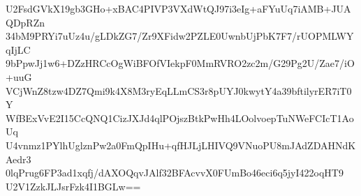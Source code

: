U2FsdGVkX19gb3GHo+xBAC4PIVP3VXdWtQJ97i3eIg+aFYuUq7iAMB+JUAQDpRZn
34bM9PRYi7uUz4u/gLDkZG7/Zr9XFidw2PZLE0UwnbUjPbK7F7/rUOPMLWYqIjLC
9bPpwJj1w6+DZzHRCcOgWiBFOfVIekpF0MmRVRO2zc2m/G29Pg2U/Zae7/iO+uuG
VCjWnZ8tzw4DZ7Qmi9k4X8M3ryEqLLmCS3r8pUYJ0kwytY4a39bftilyrER7iT0Y
WfBExVvE2I15CcQNQ1CizJXJd4qlPOjszBtkPwHh4LOolvoepTuNWeFCIcT1AoUq
U4vnmz1PYlhUglznPw2a0FmQpIHu+qfHJLjLHIVQ9VNuoPU8mJAdZDAHNdKAedr3
0lqPrug6FP3ad1xqfj/dAXOQqvJAlf32BFAcvvX0FUmBo46eci6q5jyI422oqHT9
U2V1ZzkJLJsrFzk4I1BGLw==
